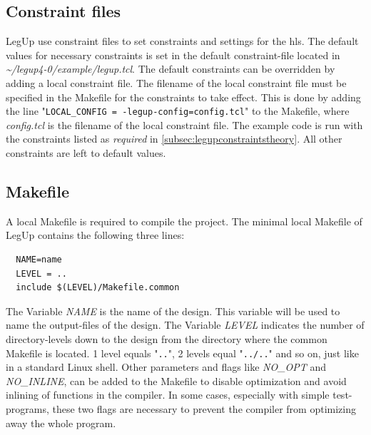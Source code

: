 \subsection{Constraint files}
LegUp use constraint files to set constraints and settings for the \gls{hls}. The default values for necessary constraints is set in the default constraint-file located in \textit{\textasciitilde/legup4-0/example/legup.tcl}. The default constraints can be overridden by adding a local constraint file. The filename of the local constraint file must be specified in the Makefile for the constraints to take effect. This is done by adding the line "\verb!LOCAL_CONFIG = -legup-config=config.tcl!" to the Makefile, where \textit{config.tcl} is the filename of the local constraint file. The example code is run with the constraints listed as \textit{required} in \cref{subsec:legupconstraintstheory}. All other constraints are left to default values.
\subsection{Makefile}
A local Makefile is required to compile the project. The minimal local Makefile of LegUp contains the following three lines:
\begin{verbatim}
  NAME=name
  LEVEL = ..
  include $(LEVEL)/Makefile.common
\end{verbatim}

The Variable \textit{NAME} is the name of the design. This variable will be used to name the output-files of the design. The Variable \textit{LEVEL} indicates the number of directory-levels down to the design from the directory where the common Makefile is located. 1 level equals "\verb!..!", 2 levels equal "\verb!../..!" and so on, just like in a standard Linux shell. Other parameters and flags like \textit{NO\_OPT} and \textit{NO\_INLINE}, can be added to the Makefile to disable optimization and avoid inlining of functions in the compiler. In some cases, especially with simple test-programs, these two flags are necessary to prevent the compiler from optimizing away the whole program.

